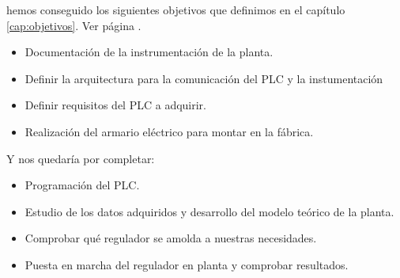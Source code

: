  hemos conseguido los siguientes objetivos que definimos en el capítulo \ref{cap:objetivos}. Ver página \pageref{Listado_objetivos}.

\begin{itemize}
	\item Documentación de la instrumentación de la planta.
	\item Definir la arquitectura para la comunicación del PLC y la instumentación
	\item Definir requisitos del PLC a adquirir.
	\item Realización del armario eléctrico para montar en la fábrica.
\end{itemize}

Y nos quedaría por completar:

\begin{itemize}
	\item Programación del PLC.
	\item Estudio de los datos adquiridos y desarrollo del modelo teórico de la planta.
	\item Comprobar qué regulador se amolda a nuestras necesidades.
	\item Puesta en marcha del regulador en planta y comprobar resultados.
\end{itemize}
